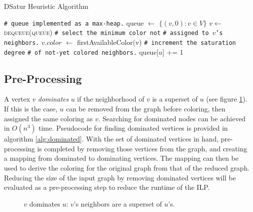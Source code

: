 \documentclass[twocolumn]{article}
\begin{document}
\begin{algorithm}
	\caption{DSatur Heuristic Algorithm}
	\begin{algorithmic}
			\State \texttt{\# queue implemented as a max-heap.}
			\State queue $\gets$ $\{ (v, 0) : v \in V \}$
				\State $v \gets$ \textsc{dequeue(queue)}
				\State \texttt{\# select the minimum color not}
				\State \texttt{\# assigned to $v$'s neighbors.}
				\State $v.color$ $\gets$ \textsf{firstAvailableColor(v)}
					\State \texttt{\# increment the saturation degree} 
					\State \texttt{\# of not-yet colored neighbors.}
					\State queue[$u$] += 1
				\EndFor
			\EndWhile
		\EndFunction
	\end{algorithmic}
	\label{alg:dsatur}
\end{algorithm}

\subsection{Pre-Processing}
A vertex $v$ \emph{dominates} $u$ if the neighborhood of $v$ is a superset of $u$ (see figure \ref{fig:dominates}). If this is the case, $u$ can be removed from the graph before coloring, then assigned the same coloring as $v$. Searching for dominated nodes can be achieved in $O(n^3)$ time. Pseudocode for finding dominated vertices is provided in algorithm \ref{alg:dominated}. With the set of dominated vertices in hand, pre-processing is completed by removing those vertices from the graph, and creating a mapping from dominated to dominating vertices. The mapping can then be used to derive the coloring for the original graph from that of the reduced graph. Reducing the size of the input graph by removing dominated vertices will be evaluated as a pre-processing step to reduce the runtime of the ILP.

\begin{figure}[H]
\centering
{}
\caption{$v$ dominates $u$: $v$'s neighbors are a superset of $u$'s.}	
\label{fig:dominates}
\end{figure}
\end{document}
